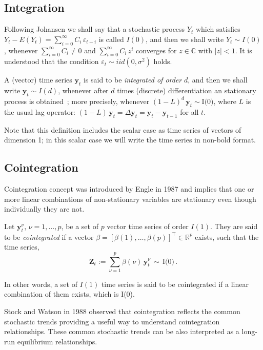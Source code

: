 \newpage
\subsection{Integration}

Following Johansen \cite{johansen1995} we shall say that a stochastic process
$Y_t$ which satisfies $Y_t-E(Y_t) = \sum_{i=0}^\infty C_i\,\varepsilon_{t-i}$ is
called $I(0)$, and then we shall write $Y_t\sim I(0)$, whenever
$\sum_{i=0}^\infty C_i \neq 0$ and $\sum_{i=0}^\infty C_i\,z^i$ converges for
$z\in\mathbb{C}$ with $|z|<1$.  It is understood that the condition
$\varepsilon_t\sim iid(0,\sigma^2)$ holds.

A (vector) time series $\mathbf{y}_t$ is said to be {\em integrated of order\/}
$d$, and then we shall write $\mathbf{y}_t\sim I(d)$, whenever after $d$ times
(discrete) differentiation an stationary process is
obtained~\cite{banerjee1993};
more precisely, whenever
$(1-L)^d\,\mathbf{y}_t\sim\text{I(0)}$, where $L$ is the usual lag operator:
$(1-L)\,\mathbf{y}_t = \Delta\mathbf{y}_t = \mathbf{y}_t-\mathbf{y}_{t-1}$ for
all $t$.  

Note that this definition includes the scalar case as time series of
vectors of dimension 1; in this scalar case we will write the time series in
non-bold format.


\subsection{Cointegration} \label{sec:cointegration}
Cointegration concept was introduced by Engle in 1987 \cite{engle1987} and implies that one or
more linear combinations of non-stationary variables are stationary even though
individually they are not.  

Let $\mathbf{y}_t^\nu$, $\nu=1,\dots,p$, be a set of $p$ vector time series of
order $I(1)$.  They are said to be {\em cointegrated\/} if a vector
$\beta=[\beta(1),\dots,\beta(p)]^\top \in \mathbb{R}^p$ exists, such that the
time series,
\begin{equation}
\mathbf{Z}_t:= 
\sum_{\nu=1}^p \beta(\nu)\,\mathbf{y}_t^\nu\,\sim\,\text{I(0)}\,.
\end{equation}

In other words, a set of $I(1)$ time series is said to be cointegrated if a
linear combination of them exists, which is I(0).

Stock and Watson in 1988 \cite{stock+watson1988} observed that
cointegration reflects the common stochastic trends providing a useful way to
understand cointegration relationships. These common stochastic trends can be
also interpreted as a long-run equilibrium relationships.

